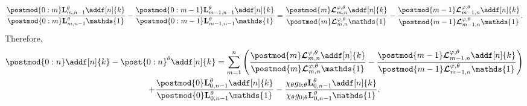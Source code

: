 \documentclass{article}
\newcommand{\precpar}{\varphi}
\newcommand{\1}{\mathbbm{1}}
\newcommand{\retrokmod}{\boldsymbol{\mathcal{L}}^{\precpar,\theta}}
\newcommand{\uk}[1]{\mathbf{L}_{#1}}
\newcommand{\md}[1]{g_{#1}}
\newcommand{\parvec}{\theta}
\def\1{\mathds{1}}
\begin{document}
$$
\frac{\postmod{0:m} \uk{m, n - 1}^\theta \addf[n]{k}}{\postmod{0:m} \uk{m, n - 1}^\theta \1_{}} - \frac{\postmod{0:m - 1} \uk{m - 1, n - 1}^\theta \addf[n]{k}}{\postmod{0:m - 1} \uk{m - 1, n - 1}^\theta \1_{}} 
= \frac{\postmod{m} \retrokmod_{m, n} \addf[n]{k}}{\postmod{m} \retrokmod_{m, n} \1_{}} - \frac{\postmod{m - 1} \retrokmod_{m - 1, n} \addf[n]{k}}{\postmod{m - 1} \retrokmod_{m - 1, n} \1_{}}. 
$$
Therefore,
\begin{multline}
\label{eq:error:decomp}
\postmod{0:n} \addf[n]{k} - \post{0:n}^\theta \addf[n]{k} = 
\sum_{m = 1}^n \left( \frac{\postmod{m} \retrokmod_{m, n} \addf[n]{k}}{\postmod{m} \retrokmod_{m, n} \1_{}} - \frac{\postmod{m - 1} \retrokmod_{m - 1, n} \addf[n]{k}}{\postmod{m - 1} \retrokmod_{m - 1, n} \1_{}} \right) \\ + \frac{\postmod{0} \uk{0, n - 1}^\theta \addf[n]{k}}{\postmod{0} \uk{0, n - 1}^\theta \1_{}} - \frac{\chi_\theta \md{0;\parvec}\uk{0, n - 1}^\theta \addf[n]{k}}{\chi_\theta\md{0;\parvec}\uk{0, n - 1}^\theta \1_{}}.
\end{multline}
\end{document}
